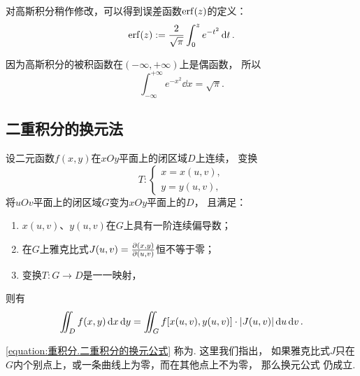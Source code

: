 \begin{remark}
对高斯积分稍作修改，可以得到误差函数\(\erf(z)\)的定义：
\begin{equation*}
	\erf(z) \defeq \frac{2}{\sqrt{\pi}} \int_0^z e^{-t^2} \dd{t}.
\end{equation*}

因为高斯积分的被积函数在\((-\infty,+\infty)\)上是偶函数，
所以\begin{equation}\label{equation:重积分.常用积分2}
	\int_{-\infty}^{+\infty} e^{-x^2} \dd{x} = \sqrt{\pi}.
\end{equation}
\end{remark}

\subsection{二重积分的换元法}
\begin{theorem}
设二元函数\(f(x,y)\)在\(xOy\)平面上的闭区域\(D\)上连续，
变换\[
	T\colon \left\{ \begin{array}{l}
		x = x(u,v), \\
		y = y(u,v),
	\end{array} \right.
\]将\(uOv\)平面上的闭区域\(G\)变为\(xOy\)平面上的\(D\)，
且满足：\begin{enumerate}
	\item \(x(u,v)\)、\(y(u,v)\)在\(G\)上具有一阶连续偏导数；
	\item 在\(G\)上雅克比式\(J(u,v) = \pdv{ (x,y) }{ (u,v) }\)恒不等于零；
	\item 变换\(T\colon G \to D\)是一一映射，
\end{enumerate}
则有\begin{equation}\label{equation:重积分.二重积分的换元公式}
	\iint_D f(x,y) \dd{x} \dd{y}
	= \iint_G f[x(u,v),y(u,v)] \cdot \abs{J(u,v)} \dd{u} \dd{v}.
\end{equation}
\end{theorem}
\cref{equation:重积分.二重积分的换元公式} 称为.
这里我们指出，
如果雅克比式\(J\)只在\(G\)内个别点上，或一条曲线上为零，而在其他点上不为零，
那么换元公式  仍成立.

